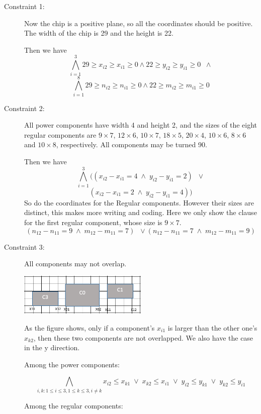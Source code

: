 \documentclass[11pt]{article}
\begin{document}
\begin{description}
  \item[Constraint 1:] Now the chip is a positive plane, so all the coordinates should be positive. The width of the chip is 29 and the height is 22.

  Then we have
  \[  \bigwedge_{i=1}^3 29 \geq x_{i2} \geq x_{i1} \geq 0 \wedge 22 \geq y_{i2} \geq y_{i1} \geq 0 \;\; \wedge \]
  \[  \bigwedge_{i=1}^8 29 \geq n_{i2} \geq n_{i1} \geq 0 \wedge 22 \geq m_{i2} \geq m_{i1} \geq 0 \]
  \item[Constraint 2:] All power components have width 4 and height 2,
  and the sizes of the eight regular components are $9 \times 7$, $12 \times 6$, $10 \times 7$, $18 \times 5$, $20 \times 4$, $10 \times 6$, $8 \times 6$ and $10 \times 8$, respectively.
  All components may be turned 90.

  Then we have
  \[  \bigwedge_{i=1}^3 ((x_{i2} - x_{i1} = 4 \; \wedge \; y_{i2} - y_{i1} = 2) \;\; \vee \]
  \[ (x_{i2} - x_{i1} = 2 \; \wedge \; y_{i2} - y_{i1} = 4)) \]
  So do the coordinates for the Regular components. However their sizes are distinct,
  this makes more writing and coding. Here we only show the clause for the first regular component,
  whose size is $9 \times 7$. \\
  \[ (n_{12} - n_{11} = 9 \; \wedge \; m_{12} - m_{11} = 7) \;\; \vee (n_{12} - n_{11} = 7 \; \wedge \; m_{12} - m_{11} = 9) \]
  \item[Constraint 3:] All components may not overlap.

\begin{center}
\includegraphics[width=0.5\textwidth]{Part1_2_1.png}
\end{center}
  As the figure shows, only if a component's $x_{i1}$ is larger than the other one's $x_{k2}$, then these two components are not overlapped. We also have the case in the y direction.

  Among the power components:

  \[  \bigwedge_{i,k: 1 \leq i \leq 3, 1 \leq k \leq 3, i \neq k}
  x_{i2} \leq x_{k1} \; \vee \; x_{k2} \leq x_{i1} \; \vee \; y_{i2} \leq y_{k1} \; \vee \; y_{k2} \leq y_{i1} \]

  Among the regular components:


\end{description}
\end{document}
